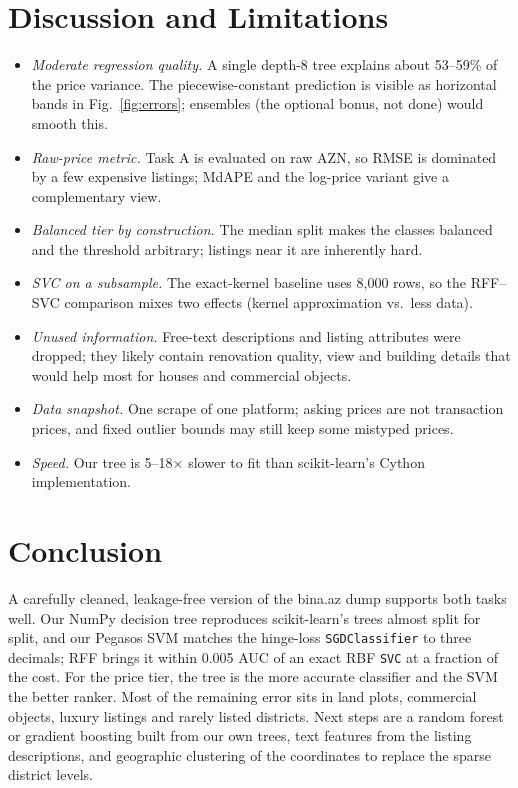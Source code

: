 \documentclass[10pt,twocolumn,a4paper]{article}
\begin{document}
\section{Discussion and Limitations}
\begin{itemize}
  \setlength\itemsep{0pt}
  \item \emph{Moderate regression quality.} A single depth-8 tree explains
        about 53--59\% of the price variance. The piecewise-constant
        prediction is visible as horizontal bands in Fig.~\ref{fig:errors};
        ensembles (the optional bonus, not done) would smooth this.
  \item \emph{Raw-price metric.} Task A is evaluated on raw AZN, so RMSE is
        dominated by a few expensive listings; MdAPE and the log-price
        variant give a complementary view.
  \item \emph{Balanced tier by construction.} The median split makes the
        classes balanced and the threshold arbitrary; listings near it are
        inherently hard.
  \item \emph{SVC on a subsample.} The exact-kernel baseline uses 8{,}000
        rows, so the RFF--SVC comparison mixes two effects (kernel
        approximation vs.\ less data).
  \item \emph{Unused information.} Free-text descriptions and listing
        attributes were dropped; they likely contain renovation quality,
        view and building details that would help most for houses and
        commercial objects.
  \item \emph{Data snapshot.} One scrape of one platform; asking prices are
        not transaction prices, and fixed outlier bounds may still keep some
        mistyped prices.
  \item \emph{Speed.} Our tree is 5--18$\times$ slower to fit than
        scikit-learn's Cython implementation.
\end{itemize}

\section{Conclusion}
A carefully cleaned, leakage-free version of the bina.az dump supports
both tasks well. Our NumPy decision tree reproduces scikit-learn's trees
almost split for split, and our Pegasos SVM matches the hinge-loss
\texttt{SGDClassifier} to three decimals; RFF brings it within 0.005 AUC of
an exact RBF \texttt{SVC} at a fraction of the cost. For the price tier,
the tree is the more accurate classifier and the SVM the better ranker.
Most of the remaining error sits in land plots, commercial objects, luxury
listings and rarely listed districts. Next steps are a random forest or
gradient boosting built from our own trees, text features from the listing
descriptions, and geographic clustering of the coordinates to replace the
sparse district levels.
\end{document}
